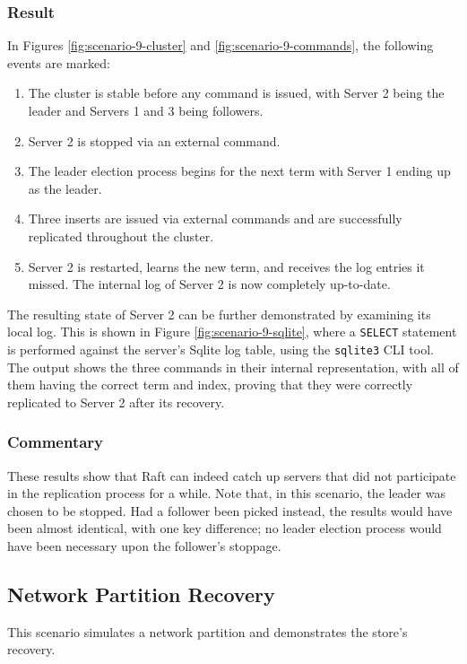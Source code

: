 \subsubsection{Result}
In Figures \ref{fig:scenario-9-cluster} and \ref{fig:scenario-9-commands}, the following events are marked:
\begin{enumerate}
    \item The cluster is stable before any command is issued, with Server 2 being the leader and Servers 1 and 3 being followers.
    \item Server 2 is stopped via an external command.
    \item The leader election process begins for the next term with Server 1 ending up as the leader.
    \item Three inserts are issued via external commands and are successfully replicated throughout the cluster.
    \item Server 2 is restarted, learns the new term, and receives the log entries it missed. The internal log of Server 2 is now completely up-to-date.
\end{enumerate}

The resulting state of Server 2 can be further demonstrated by examining its local log. This is shown in Figure \ref{fig:scenario-9-sqlite}, where a \lstinline|SELECT| statement is performed against the server's Sqlite log table, using the \lstinline|sqlite3| CLI tool. The output shows the three commands in their internal representation, with all of them having the correct term and index, proving that they were correctly replicated to Server 2 after its recovery.

\subsubsection{Commentary}

These results show that Raft can indeed catch up servers that did not participate in the replication process for a while. Note that, in this scenario, the leader was chosen to be stopped. Had a follower been picked instead, the results would have been almost identical, with one key difference; no leader election process would have been necessary upon the follower's stoppage. 

\subsection{Network Partition Recovery}

This scenario simulates a network partition and demonstrates the store's recovery.

